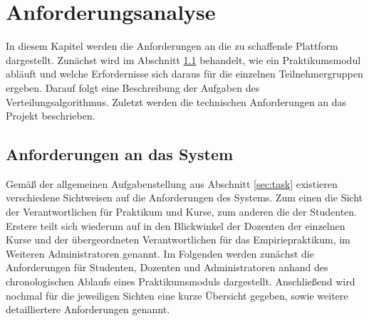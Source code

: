 \chapter{Anforderungsanalyse}
\label{chapter:requirements}    

    In diesem Kapitel werden die Anforderungen an die zu schaffende Plattform dargestellt.
    Zunächst wird im Abschnitt \ref{sec:systemrequirements} behandelt, wie ein Praktikumsmodul abläuft und welche Erfordernisse sich daraus für die einzelnen Teilnehmergruppen ergeben.
    Darauf folgt eine Beschreibung der Aufgaben des Verteilungsalgorithmus.
    Zuletzt werden die technischen Anforderungen an das Projekt beschrieben.
    
    \section{Anforderungen an das System}
    \label{sec:systemrequirements}
        Gemäß der allgemeinen Aufgabenstellung aus Abschnitt \ref{sec:task} existieren verschiedene Sichtweisen auf die Anforderungen des Systems.
        Zum einen die Sicht der Verantwortlichen für Praktikum und Kurse, zum anderen die der Studenten.
        Erstere teilt sich wiederum auf in den Blickwinkel der Dozenten der einzelnen Kurse und der übergeordneten Verantwortlichen für das Empiriepraktikum, im Weiteren Administratoren genannt.
        Im Folgenden werden zunächst die Anforderungen für Studenten, Dozenten und Administratoren anhand des chronologischen Ablaufs eines Praktikumsmoduls dargestellt.
        Anschließend wird nochmal für die jeweiligen Sichten eine kurze Übersicht gegeben, sowie weitere detailliertere Anforderungen genannt.
        
